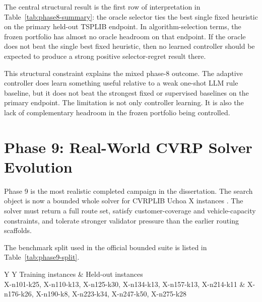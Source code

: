 The central structural result is the first row of interpretation in
Table~\ref{tab:phase8-summary}: the oracle selector ties the best single fixed heuristic on the
primary held-out TSPLIB endpoint. In algorithm-selection terms, the frozen portfolio has almost no
oracle headroom on that endpoint. If the oracle does not beat the single best fixed heuristic, then
no learned controller should be expected to produce a strong positive selector-regret result there.

This structural constraint explains the mixed phase-8 outcome. The adaptive controller does learn
something
useful relative to a weak one-shot LLM rule baseline, but it does not beat the strongest fixed or
supervised baselines on the primary endpoint. The limitation is not only controller learning. It is
also the lack of complementary headroom in the frozen portfolio being controlled.

\section{Phase 9: Real-World CVRP Solver Evolution}
\label{sec:advanced-phase9}

Phase 9 is the most realistic completed campaign in the dissertation. The search object is now a
bounded whole solver for CVRPLIB Uchoa X instances \cite{uchoa2017}. The solver must return a full
route set, satisfy customer-coverage and vehicle-capacity constraints, and tolerate stronger
validator pressure than the earlier routing scaffolds.

The benchmark split used in the official bounded suite is listed in
Table~\ref{tab:phase9-split}.

\begin{table}[t]
\centering
\scriptsize
\setlength{\tabcolsep}{4pt}
\begin{tabularx}{\textwidth}{Y Y}
\toprule
Training instances & Held-out instances \\
\midrule
X-n101-k25, X-n110-k13, X-n125-k30, X-n134-k13, X-n157-k13, X-n214-k11 & X-n176-k26, X-n190-k8, X-n223-k34, X-n247-k50, X-n275-k28 \\
\bottomrule
\end{tabularx}
\caption[Phase-9 CVRPLIB X split]{Phase-9 bounded CVRPLIB X split, with six training instances and five held-out instances. The
train/held-out separation is fixed before the campaign and is not reopened during solver
evolution.}
\label{tab:phase9-split}
\end{table}

